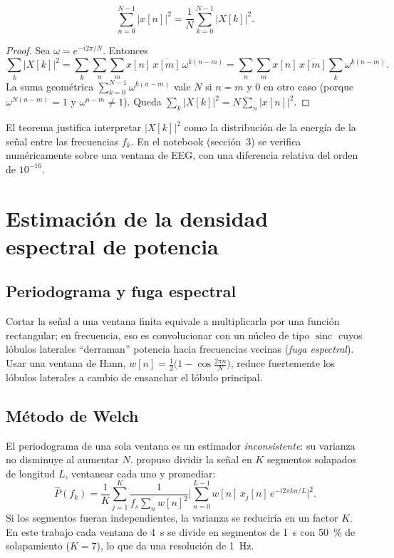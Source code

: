 \begin{teorema}\label{teo:parseval}
\[
\sum_{n=0}^{N-1} |x[n]|^2 = \frac1N \sum_{k=0}^{N-1} |X[k]|^2.
\]
\end{teorema}
\begin{proof}
Sea $\omega = e^{-i2\pi/N}$. Entonces
\[
\sum_k |X[k]|^2 = \sum_k \sum_n \sum_m x[n]\,\overline{x[m]}\,\omega^{k(n-m)}
= \sum_n \sum_m x[n]\,\overline{x[m]} \sum_k \omega^{k(n-m)}.
\]
La suma geométrica $\sum_{k=0}^{N-1}\omega^{k(n-m)}$ vale $N$ si $n=m$ y $0$ en otro caso (porque $\omega^{N(n-m)}=1$ y $\omega^{n-m}\neq 1$). Queda $\sum_k|X[k]|^2 = N\sum_n |x[n]|^2$.
\end{proof}

El teorema justifica interpretar $|X[k]|^2$ como la distribución de la energía de la señal entre las frecuencias $f_k$. En el notebook (sección~3) se verifica numéricamente sobre una ventana de EEG, con una diferencia relativa del orden de $10^{-16}$.

\section{Estimación de la densidad espectral de potencia}

\subsection{Periodograma y fuga espectral}

Cortar la señal a una ventana finita equivale a multiplicarla por una función rectangular; en frecuencia, eso es convolucionar con un núcleo de tipo $\operatorname{sinc}$ cuyos lóbulos laterales ``derraman'' potencia hacia frecuencias vecinas (\emph{fuga espectral}). Usar una ventana de Hann, $w[n] = \tfrac12\big(1 - \cos\tfrac{2\pi n}{N}\big)$, reduce fuertemente los lóbulos laterales a cambio de ensanchar el lóbulo principal.

\subsection{Método de Welch}

El periodograma de una sola ventana es un estimador \emph{inconsistente}: su varianza no disminuye al aumentar $N$. \textcite{welch1967} propuso dividir la señal en $K$ segmentos solapados de longitud $L$, ventanear cada uno y promediar:
\begin{equation}
\hat P(f_k) = \frac{1}{K}\sum_{j=1}^{K} \frac{1}{f_s \sum_n w[n]^2}\Big|\sum_{n=0}^{L-1} w[n]\, x_j[n]\, e^{-i2\pi kn/L}\Big|^2.
\label{eq:welch}
\end{equation}
Si los segmentos fueran independientes, la varianza se reduciría en un factor $K$. En este trabajo cada ventana de 4~s se divide en segmentos de 1~s con 50~\% de solapamiento ($K=7$), lo que da una resolución de 1~Hz.

